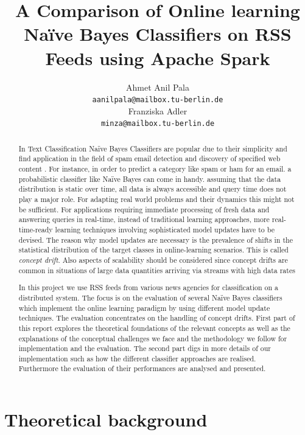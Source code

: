\documentclass{article} %
\title{A Comparison of Online learning Na\"ive Bayes Classifiers on RSS Feeds using Apache Spark}
\author{
Ahmet Anil Pala\\
\texttt{aanilpala@mailbox.tu-berlin.de} \\
\And
Franziska Adler \\
\texttt{minza@mailbox.tu-berlin.de} \\
}
\begin{document}
\maketitle

\begin{abstract}
In Text Classification Na\"ive Bayes Classifiers are popular due to their simplicity and find application in the field of spam email detection and discovery of specified web content \cite[p. 225]{ertel2008}. For instance, in order to predict a category like spam or ham for an email. a probabilistic classifier like Na\"ive Bayes can come in handy. assuming that the data distribution is static over time, all data is always accessible and query time does not play a major role. For adapting real world problems and their dynamics this might not be sufficient. For applications requiring immediate processing of fresh data and answering queries in real-time, instead of traditional learning approaches, more real-time-ready learning techniques involving sophisticated model updates have to be devised. The reason why model updates are necessary is the prevalence of shifts in the statistical distribution of the target classes in online-learning scenarios. This is called \textit{concept drift}. Also aspects of scalability should be considered since concept drifts are common in situations of large data quantities arriving via streams with high data rates \cite[p. 4]{tsymbal2004}   

In this project we use RSS feeds from various news agencies for classification on a distributed system. The focus is on the evaluation of several Na\"ive Bayes classifiers which implement the online learning paradigm by using different model update techniques.  The evaluation concentrates on the handling of concept drifts. First part of this report explores the theoretical foundations of the relevant concepts as well as the explanations of the conceptual challenges we face and the methodology we follow for implementation and the evaluation. The second part digs in more details of our implementation such as how the different classifier approaches are realised. Furthermore the evaluation of their performances are analysed and presented.

\end{abstract}

\section{Theoretical background}
\end{document}
